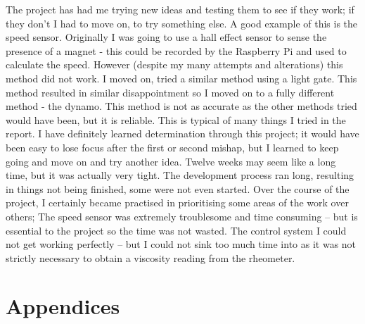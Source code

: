 \documentclass[twoside,a4]{report}
\def\shorttitle{Development of a Rheometer Controller}
\def\br{\newline \newline \noindent}
\def\achapter{\shorttitle}  %
\begin{document}
	The project has had me trying new ideas and testing them to see if they work; if they don't I had to move on, to try something else. A good example of this is the speed sensor. Originally I was going to use a hall effect sensor to sense the presence of a magnet - this could be recorded by the Raspberry Pi and used to calculate the speed. However (despite my many attempts and alterations) this method did not work. I moved on, tried a similar method using a light gate. This method resulted in similar disappointment so I moved on to a fully different method - the dynamo. This method is not as accurate as the other methods tried would have been, but it is reliable. This is typical of many things I tried in the report. I have definitely learned determination through this project; it would have been easy to lose focus after the first or second mishap, but I learned to keep going and move on and try another idea.
	\br
	Twelve weeks may seem like a long time, but it was actually very tight. The development process ran long, resulting in things not being finished, some were not even started. Over the course of the project, I certainly became practised in prioritising some areas of the work over others; The speed sensor was extremely troublesome and time consuming -- but is essential to the project so the time was not wasted. The control system I could not get working perfectly -- but I could not sink too much time into as it was not strictly necessary to obtain a viscosity reading from the rheometer.
	
	\newpage
	\def\achapter{Nomenclature}
	\printnomenclature[1.5cm]
	
	\newpage
	\def\achapter{Bibliography}
	
	




\appendix


\chapter*{Appendices}
\end{document}
